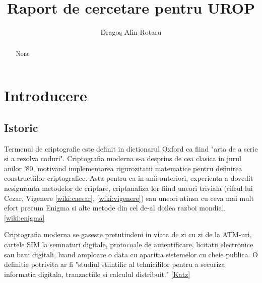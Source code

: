 \documentclass{llncs}
\begin{document}
\pagestyle{empty}
%
%
\title{Raport de cercetare pentru UROP}
%
%
\author{Drago\c{s} Alin Rotaru}
%



\maketitle              %

\begin{abstract}
  None
\end{abstract}


\section{Introducere}
\label{sec:intro}

\subsection{Istoric}
Termenul de criptografie este definit in dictionarul Oxford ca fiind "arta de a scrie si a rezolva coduri".
Criptografia moderna s-a desprins de cea clasica in jurul anilor '80, motivand implementarea rigurozitatii matematice pentru definirea constructiilor criptografice. Asta pentru ca in anii anteriori, experienta a dovedit nesiguranta metodelor de criptare, criptanaliza lor fiind uneori triviala (cifrul lui Cezar, Vigenere \ref{wiki:caesar}, \ref{wiki:vigenere}) sau uneori atinsa cu ceva mai mult efort precum Enigma si alte metode din cel de-al doilea razboi mondial. \ref{wiki:enigma}

Criptografia moderna se gaseste pretutindeni in viata de zi cu zi de la ATM-uri, cartele SIM la semnaturi digitale, protocoale de autentificare, licitatii electronice sau bani digitali, luand amploare o data cu aparitia sistemelor cu cheie publica. O definitie potrivita ar fi "studiul stiintific al tehnicililor pentru a securiza informatia digitala, tranzactiile si calculul distribuit." \ref{Katz}
\end{document}
